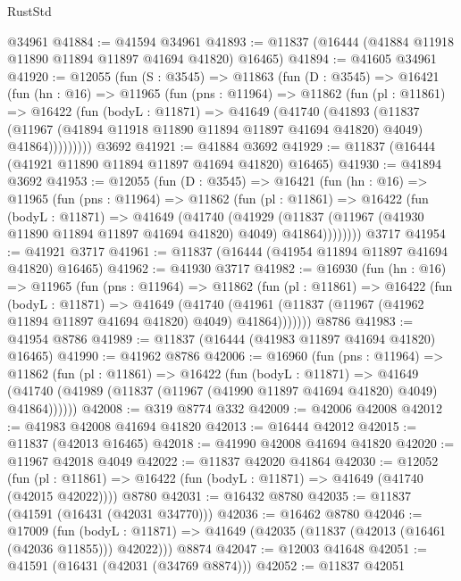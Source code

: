 \begin{lexlean}{RustStd}
\begin{coremodule}
    @34961
@41884 := @41594 @34961
@41893 := @11837 (@16444 (@41884 @11918 @11890 @11894 @11897 @41694 @41820) @16465)
@41894 := @41605 @34961
@41920 := @12055
    (fun (S : @3545) =>
    @11863
      (fun (D : @3545) =>
      @16421
        (fun (hn : @16) =>
        @11965
          (fun (pns : @11964) =>
          @11862
            (fun (pl : @11861) =>
            @16422
              (fun (bodyL : @11871) =>
              @41649
                (@41740
                  (@41893
                    (@11837
                      (@11967 (@41894 @11918 @11890 @11894 @11897 @41694 @41820) @4049)
                      @41864)))))))))
    @3692
@41921 := @41884 @3692
@41929 := @11837 (@16444 (@41921 @11890 @11894 @11897 @41694 @41820) @16465)
@41930 := @41894 @3692
@41953 := @12055
    (fun (D : @3545) =>
    @16421
      (fun (hn : @16) =>
      @11965
        (fun (pns : @11964) =>
        @11862
          (fun (pl : @11861) =>
          @16422
            (fun (bodyL : @11871) =>
            @41649
              (@41740
                (@41929
                  (@11837 (@11967 (@41930 @11890 @11894 @11897 @41694 @41820) @4049) @41864))))))))
    @3717
@41954 := @41921 @3717
@41961 := @11837 (@16444 (@41954 @11894 @11897 @41694 @41820) @16465)
@41962 := @41930 @3717
@41982 := @16930
    (fun (hn : @16) =>
    @11965
      (fun (pns : @11964) =>
      @11862
        (fun (pl : @11861) =>
        @16422
          (fun (bodyL : @11871) =>
          @41649
            (@41740
              (@41961 (@11837 (@11967 (@41962 @11894 @11897 @41694 @41820) @4049) @41864)))))))
    @8786
@41983 := @41954 @8786
@41989 := @11837 (@16444 (@41983 @11897 @41694 @41820) @16465)
@41990 := @41962 @8786
@42006 := @16960
    (fun (pns : @11964) =>
    @11862
      (fun (pl : @11861) =>
      @16422
        (fun (bodyL : @11871) =>
        @41649 (@41740 (@41989 (@11837 (@11967 (@41990 @11897 @41694 @41820) @4049) @41864))))))
@42008 := @319 @8774 @332
@42009 := @42006 @42008
@42012 := @41983 @42008 @41694 @41820
@42013 := @16444 @42012
@42015 := @11837 (@42013 @16465)
@42018 := @41990 @42008 @41694 @41820
@42020 := @11967 @42018 @4049
@42022 := @11837 @42020 @41864
@42030 := @12052
    (fun (pl : @11861) => @16422 (fun (bodyL : @11871) => @41649 (@41740 (@42015 @42022))))
    @8780
@42031 := @16432 @8780
@42035 := @11837 (@41591 (@16431 (@42031 @34770)))
@42036 := @16462 @8780
@42046 := @17009
    (fun (bodyL : @11871) => @41649 (@42035 (@11837 (@42013 (@16461 (@42036 @11855))) @42022)))
    @8874
@42047 := @12003 @41648
@42051 := @41591 (@16431 (@42031 (@34769 @8874)))
@42052 := @11837 @42051

\end{coremodule}
\end{lexlean}

